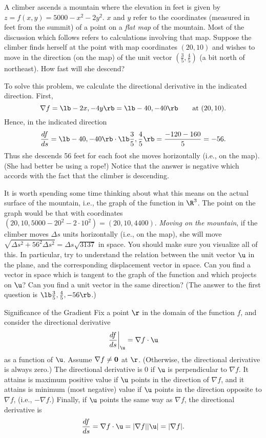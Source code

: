 \nextex
{}  A climber ascends a mountain where the elevation
in feet
is given by $z = f(x,y) = 5000 - x^2 - 2y^2$.  $x$ and $y$ refer
to the coordinates (measured in feet
from the summit)  of a point on a {\it flat map\/} of the
mountain.
  Most of the discussion which follows refers
to calculations involving that map.   Suppose the climber
finds herself at the point with map coordinates $(20,10)$ and
wishes to move in the direction (on the map) of the unit
vector $(\frac 35,\frac 45)$ (a bit north of northeast).  How
fast will she descend?

To solve this problem, we calculate the directional derivative
in the indicated direction.  First,
$$
 \nabla f = \lb -2x, -4y \rb = \lb -40, -40 \rb\qquad\text{at } (20,10).
$$
Hence, in the indicated direction
$$
   \frac{df}{ds} = \lb -40, -40 \rb\cdot\lb \frac 35, \frac 45 \rb
            = \frac{-120 -160}5 = -56.
$$
Thus she descends 56 feet for each foot she moves horizontally (i.e.,
on the map).
(She had better be using a rope!)  Notice
that the answer is negative which accords with the fact that the
climber is descending.

It is worth spending some time thinking about what this means on
the actual surface of the mountain, i.e., the graph of the
function in $\R^3$.   The point on the graph would be
that with coordinates $(20,10,5000 - 20^2 - 2\cdot10^2) = (20,10,4400)$.
{\it Moving on the mountain\/}, 
if the climber moves $\Delta s$ units horizontally
(i.e., on the map), she will move $\sqrt{\Delta s^2 + 56^2
\Delta s^2} = \Delta s \sqrt{3137}$ in space. 
You should make sure you visualize all of this.  In particular,
try to understand the relation between the unit vector
$\u$ in the plane, and the corresponding displacement vector
in space.   Can you find a vector in space which is
tangent to the graph of the function and which projects on
$\u$?   Can you find a unit vector in the same direction?
(The answer to the first question is $\lb \frac 35, \frac 45,-56
\rb$.)
\endexample

\subhead Significance of the Gradient \endsubhead
Fix a point $\r$ in the domain of the function $f$, and consider
the directional derivative
$$
     \left. \frac {df}{ds}\right|_{\u} = \nabla f\cdot\u
$$
%
as a function of $\u$.  Assume $\nabla f \ne \bold 0$
at $\r$.  (Otherwise, the directional derivative is always
zero.)  The directional derivative is 0 if 
$\u$ is perpendicular to $\nabla f$.  It attains is maximum positive
value if $\u$ points in the direction of $\nabla f$, and it
attains is minimum (most negative) value if $\u$ points in the
direction opposite to $\nabla f$, (i.e., $-\nabla f$.)
Finally, if $\u$ points the same way as $\nabla f$, the directional
derivative is
$$
   \frac{df}{ds} = \nabla f\cdot\u = |\nabla f||\u| = |\nabla f|.
$$

